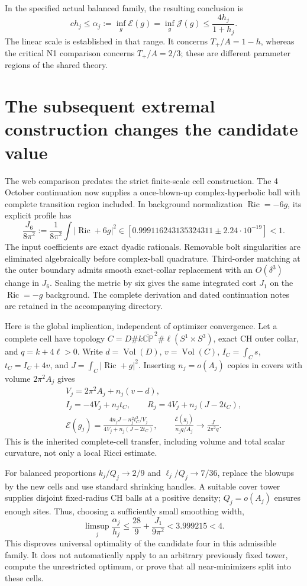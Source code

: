 \documentclass[11pt]{article}
\theoremstyle{remark}
\newcommand{\Ric}{\operatorname{Ric}}
\newcommand{\Vol}{\operatorname{Vol}}
\newcommand{\CP}{\mathbb{CP}}
\newcommand{\E}{\mathcal E}
\newcommand{\J}{\mathcal J}
\begin{document}
In the specified actual balanced family, the resulting conclusion is
\[
 c h_j\le\alpha_j:=\inf_g\E(g)=\inf_g\J(g)
 \le\frac{4h_j}{1+h_j}.
\]
The linear scale is established in that range. It concerns
$T_+/A=1-h$, whereas the critical N1 comparison concerns $T_+/A=2/3$;
these are different parameter regions of the shared theory.

\section{The subsequent extremal construction changes the candidate value}
\label{sec:subfour}

The web comparison predates the strict finite-scale cell construction.
The 4 October continuation now supplies a once-blown-up complex-hyperbolic
ball with complete transition region included. In background
normalization $\Ric=-6g$, its explicit profile has
\begin{equation}\label{eq:cell-ball}
 \frac{J_6}{8\pi^2}:=
 \frac{1}{8\pi^2}\int|\Ric+6g|^2
 \in[0.999116243135324311\pm2.24\cdot10^{-19}]<1.
\end{equation}
The input coefficients are exact dyadic rationals. Removable bolt
singularities are eliminated algebraically before complex-ball
quadrature. Third-order matching at the outer boundary admits smooth
exact-collar replacement with an $O(\delta^3)$ change in $J_6$.
Scaling the metric by six gives the same integrated cost $J_1$ on
the $\Ric=-g$ background. The complete derivation and dated continuation
notes are retained in the accompanying  directory.

Here is the global implication, independent of optimizer convergence.
Let a complete cell have topology
 $C=D\#k\overline{\CP}^{\,2}\#\ell(S^1\times S^3)$, exact CH
outer collar, and $q=k+4\ell>0$. Write $d=\Vol(D)$,
$v=\Vol(C)$, $I_C=\int_Cs$, $t_C=I_C+4v$, and
$J=\int_C|\Ric+g|^2$. Inserting $n_j=o(A_j)$ copies in covers
with volume $2\pi^2A_j$ gives
\begin{gather}
 V_j=2\pi^2A_j+n_j(v-d),\\
 I_j=-4V_j+n_jt_C,\qquad R_j=4V_j+n_j(J-2t_C),\\
 \E(g_j)=\frac{4n_jJ-n_j^2t_C^2/V_j}
 {4V_j+n_j(J-2t_C)},\qquad
 \frac{\E(g_j)}{n_jq/A_j}\longrightarrow\frac{J}{2\pi^2q}.
\end{gather}
This is the inherited complete-cell transfer, including volume and
total scalar curvature, not only a local Ricci estimate.

For balanced proportions $k_j/Q_j\to2/9$ and
$\ell_j/Q_j\to7/36$, replace the blowups by the new cells and use
standard shrinking handles. A suitable cover tower supplies disjoint
fixed-radius CH balls at a positive density; $Q_j=o(A_j)$ ensures
enough sites. Thus, choosing a sufficiently small smoothing width,
\begin{equation}\label{eq:subfour}
 \limsup_j\frac{\alpha_j}{h_j}
 \le\frac{28}{9}+\frac{J_1}{9\pi^2}<3.999215<4.
\end{equation}
This disproves universal optimality of the candidate four in this
admissible family. It does not automatically apply to an arbitrary
previously fixed tower, compute the unrestricted optimum, or prove
that all near-minimizers split into these cells.
\end{document}
